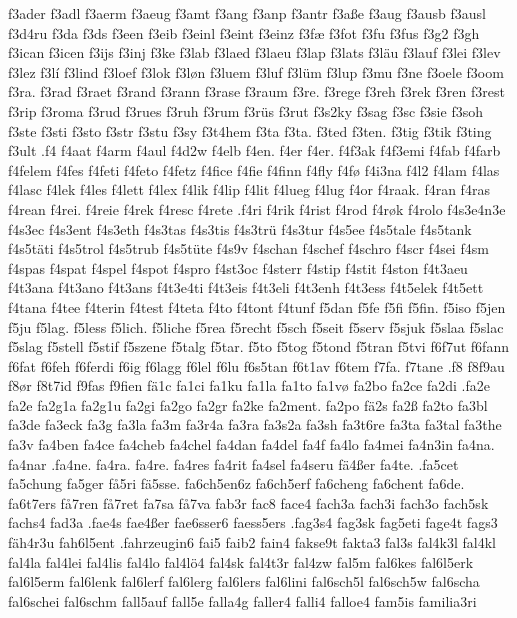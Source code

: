 f3ader
f3adl
f3aerm
f3aeug
f3amt
f3ang
f3anp
f3antr
f3aße
f3aug
f3ausb
f3ausl
f3d4ru
f3da
f3ds
f3een
f3eib
f3einl
f3eint
f3einz
f3fæ
f3fot
f3fu
f3fus
f3g2
f3gh
f3ican
f3icen
f3ijs
f3inj
f3ke
f3lab
f3laed
f3laeu
f3lap
f3lats
f3läu
f3lauf
f3lei
f3lev
f3lez
f3lí
f3lind
f3loef
f3lok
f3løn
f3luem
f3luf
f3lüm
f3lup
f3mu
f3ne
f3oele
f3oom
f3ra.
f3rad
f3raet
f3rand
f3rann
f3rase
f3raum
f3re.
f3rege
f3reh
f3rek
f3ren
f3rest
f3rip
f3roma
f3rud
f3rues
f3ruh
f3rum
f3rüs
f3rut
f3s2ky
f3sag
f3sc
f3sie
f3soh
f3ste
f3sti
f3sto
f3str
f3stu
f3sy
f3t4hem
f3ta
f3ta.
f3ted
f3ten.
f3tig
f3tik
f3ting
f3ult
.f4
f4aat
f4arm
f4aul
f4d2w
f4elb
f4en.
f4er
f4er.
f4f3ak
f4f3emi
f4fab
f4farb
f4felem
f4fes
f4feti
f4feto
f4fetz
f4fice
f4fie
f4finn
f4fly
f4fø
f4i3na
f4l2
f4lam
f4las
f4lasc
f4lek
f4les
f4lett
f4lex
f4lik
f4lip
f4lit
f4lueg
f4lug
f4or
f4raak.
f4ran
f4ras
f4rean
f4rei.
f4reie
f4rek
f4resc
f4rete
.f4ri
f4rik
f4rist
f4rod
f4røk
f4rolo
f4s3e4n3e
f4s3ec
f4s3ent
f4s3eth
f4s3tas
f4s3tis
f4s3trü
f4s3tur
f4s5ee
f4s5tale
f4s5tank
f4s5täti
f4s5trol
f4s5trub
f4s5tüte
f4s9v
f4schan
f4schef
f4schro
f4scr
f4sei
f4sm
f4spas
f4spat
f4spel
f4spot
f4spro
f4st3oc
f4sterr
f4stip
f4stit
f4ston
f4t3aeu
f4t3ana
f4t3ano
f4t3ans
f4t3e4ti
f4t3eis
f4t3eli
f4t3enh
f4t3ess
f4t5elek
f4t5ett
f4tana
f4tee
f4terin
f4test
f4teta
f4to
f4tont
f4tunf
f5dan
f5fe
f5fi
f5fin.
f5iso
f5jen
f5ju
f5lag.
f5less
f5lich.
f5liche
f5rea
f5recht
f5sch
f5seit
f5serv
f5sjuk
f5slaa
f5slac
f5slag
f5stell
f5stif
f5szene
f5talg
f5tar.
f5to
f5tog
f5tond
f5tran
f5tvi
f6f7ut
f6fann
f6fat
f6feh
f6ferdi
f6ig
f6lagg
f6lel
f6lu
f6s5tan
f6t1av
f6tem
f7fa.
f7tane
.f8
f8f9au
f8ør
f8t7id
f9fas
f9fien
fä1c
fa1ci
fa1ku
fa1la
fa1to
fa1vø
fa2bo
fa2ce
fa2di
.fa2e
fa2e
fa2g1a
fa2g1u
fa2gi
fa2go
fa2gr
fa2ke
fa2ment.
fa2po
fä2s
fa2ß
fa2to
fa3bl
fa3de
fa3eck
fa3g
fa3la
fa3m
fa3r4a
fa3ra
fa3s2a
fa3sh
fa3t6re
fa3ta
fa3tal
fa3the
fa3v
fa4ben
fa4ce
fa4cheb
fa4chel
fa4dan
fa4del
fa4f
fa4lo
fa4mei
fa4n3in
fa4na.
fa4nar
.fa4ne.
fa4ra.
fa4re.
fa4res
fa4rit
fa4sel
fa4seru
fä4ßer
fa4te.
.fa5cet
fa5chung
fa5ger
få5ri
fä5sse.
fa6ch5en6z
fa6ch5erf
fa6cheng
fa6chent
fa6de.
fa6t7ers
få7ren
få7ret
fa7sa
få7va
fab3r
fac8
face4
fach3a
fach3i
fach3o
fach5sk
fachs4
fad3a
.fae4s
fae4ßer
fae6sser6
faess5ers
.fag3s4
fag3sk
fag5eti
fage4t
fags3
fäh4r3u
fah6l5ent
.fahrzeugin6
fai5
faib2
fain4
fakse9t
fakta3
fal3s
fal4k3l
fal4kl
fal4la
fal4lei
fal4lis
fal4lo
fal4lö4
fal4sk
fal4t3r
fal4zw
fal5m
fal6kes
fal6l5erk
fal6l5erm
fal6lenk
fal6lerf
fal6lerg
fal6lers
fal6lini
fal6sch5l
fal6sch5w
fal6scha
fal6schei
fal6schm
fall5auf
fall5e
falla4g
faller4
falli4
falloe4
fam5is
familia3ri
